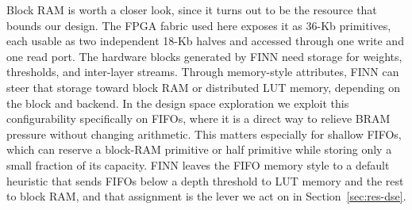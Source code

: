 Block RAM is worth a closer look, since it turns out to be the resource that bounds
our design. The FPGA fabric used here exposes it as 36-Kb primitives, each usable
as two independent 18-Kb halves and accessed through one write and one read port.
The hardware blocks generated by FINN need storage for weights, thresholds, and
inter-layer streams. Through memory-style attributes, FINN can steer that storage
toward block RAM or distributed LUT memory, depending on the block and backend. In
the design space exploration we exploit this configurability
specifically on FIFOs, where it is a direct way to relieve BRAM pressure without
changing arithmetic. This matters
especially for shallow FIFOs, which can reserve a block-RAM primitive or half
primitive while storing only a small fraction of its capacity. FINN leaves the
FIFO memory style to a default heuristic that sends FIFOs below a depth threshold
to LUT memory and the rest to block RAM, and that assignment is the lever we act
on in Section~\ref{sec:res-dse}.
